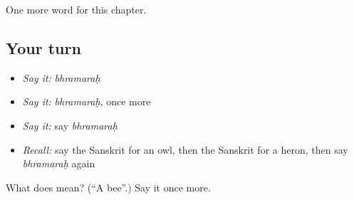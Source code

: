 \begin{grammarlens}[title={What you've built}]
One more word for this chapter.
\end{grammarlens}

\subsection*{Your turn}
\begin{itemize}
\raggedright
  \item \emph{Say it:} \emph{bhramaraḥ}
  \item \emph{Say it:} \emph{bhramaraḥ}, once more
  \item \emph{Say it:} say \emph{bhramaraḥ}
  \item \emph{Recall:} say the Sanskrit for an owl, then the Sanskrit for a heron, then say \emph{bhramaraḥ} again
\end{itemize}

\begin{tcolorbox}[breakable,colback=teal!4,colframe=teal!35!black,title={Before you move on}]
What does  mean? (\textquotedblleft{}A bee\textquotedblright{}.) Say it once more.
\end{tcolorbox}
